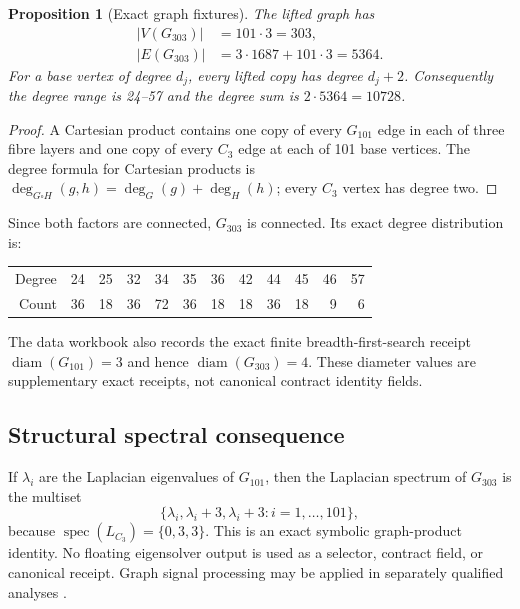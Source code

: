 \documentclass[11pt,a4paper]{article}
\newtheorem{proposition}[theorem]{Proposition}
\theoremstyle{definition}
\newcommand{\Gone}{G_{101}}
\newcommand{\Gthree}{G_{303}}
\begin{document}
\begin{proposition}[Exact graph fixtures]
The lifted graph has
\begin{align}
|V(\Gthree)|&=101\cdot3=303,\\
|E(\Gthree)|&=3\cdot1687+101\cdot3=5364.
\end{align}
For a base vertex of degree $d_j$, every lifted copy has degree $d_j+2$. Consequently the degree range is 24--57 and the degree sum is $2\cdot5364=10728$.
\end{proposition}

\begin{proof}
A Cartesian product contains one copy of every $\Gone$ edge in each of three fibre layers and one copy of every $C_3$ edge at each of 101 base vertices. The degree formula for Cartesian products is $\deg_{G\square H}(g,h)=\deg_G(g)+\deg_H(h)$; every $C_3$ vertex has degree two.
\end{proof}

Since both factors are connected, $\Gthree$ is connected. Its exact degree distribution is:
\begin{center}
\begin{tabular}{@{}rrrrrrrrrrrr@{}}
\toprule
Degree & 24&25&32&34&35&36&42&44&45&46&57\\
Count  & 36&18&36&72&36&18&18&36&18&9&6\\
\bottomrule
\end{tabular}
\end{center}
The data workbook also records the exact finite breadth-first-search receipt $\operatorname{diam}(\Gone)=3$ and hence $\operatorname{diam}(\Gthree)=4$. These diameter values are supplementary exact receipts, not canonical contract identity fields.

\subsection{Structural spectral consequence}
If $\lambda_i$ are the Laplacian eigenvalues of $\Gone$, then the Laplacian spectrum of $\Gthree$ is the multiset
\begin{equation}
\{\lambda_i,\lambda_i+3,\lambda_i+3: i=1,\ldots,101\},
\end{equation}
because $\operatorname{spec}(L_{C_3})=\{0,3,3\}$. This is an exact symbolic graph-product identity. No floating eigensolver output is used as a selector, contract field, or canonical receipt. Graph signal processing may be applied in separately qualified analyses \cite{shuman2013gsp,pirondini2016surrogate}.
\end{document}
